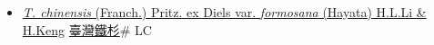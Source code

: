 \begin{itemize}
  \begin{itemize}
        \item[] \href{http://www.theplantlist.org/tpl1.1/search?q=Tsuga+chinensis+var.+formosana}{\textit{T. chinensis} (Franch.) Pritz. ex Diels var. \textit{formosana} (Hayata) H.L.Li \& H.Keng}   \href{\detokenize{http://taibnet.sinica.edu.tw/chi/taibnet_species_list.php?T2=臺灣鐵杉&T2_new_value=true&fr=y}}{臺灣鐵杉}\# LC
  \end{itemize}
  \end{itemize}
